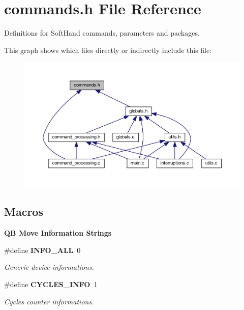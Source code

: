 \section{commands.\+h File Reference}
\label{commands_8h}


Definitions for Soft\+Hand commands, parameters and packages.  


This graph shows which files directly or indirectly include this file\+:\nopagebreak
\begin{figure}[H]
\begin{center}
\leavevmode
\includegraphics[width=350pt]{commands_8h__dep__incl}
\end{center}
\end{figure}
\subsection*{Macros}
\begin{Indent}\textbf{ QB Move Information Strings}\par
\begin{DoxyCompactItemize}
\item 
\mbox{\label{commands_8h_a2ba44fc5b8a316bd307d0baa9ab629ef}} 
\#define \textbf{ I\+N\+F\+O\+\_\+\+A\+LL}~0
\begin{DoxyCompactList}\small\item\em Generic device informations. \end{DoxyCompactList}\item 
\mbox{\label{commands_8h_a3a52d8c1fc0a681a8b8bdb9434ec1ee6}} 
\#define \textbf{ C\+Y\+C\+L\+E\+S\+\_\+\+I\+N\+FO}~1
\begin{DoxyCompactList}\small\item\em Cycles counter informations. \end{DoxyCompactList}\end{DoxyCompactItemize}
\end{Indent}
